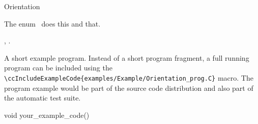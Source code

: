 

\begin{ccRefEnum}{Orientation}  %


\ccDefinition
  
The enum \ccRefName\ does this and that.



\ccIsModel


\ccSeeAlso

,
.

\ccExample

A short example program.
Instead of a short program fragment, a full running program can be
included using the 
\verb|\ccIncludeExampleCode{examples/Example/Orientation_prog.C}| 
macro. The program example would be part of the source code distribution and
also part of the automatic test suite.

\begin{ccExampleCode}
void your_example_code() {
}
\end{ccExampleCode}


\end{ccRefEnum}



